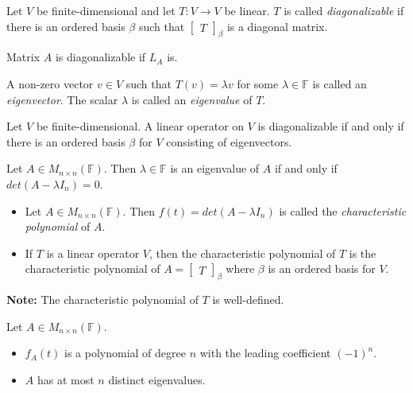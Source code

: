 \documentclass[12pt]{article}
\newenvironment{theorem}[2][Theorem]{\begin{trivlist}
\item[\hskip \labelsep {\bfseries #1}\hskip \labelsep {\bfseries #2.}]}{\end{trivlist}}
\newenvironment{definition}[2][Definition]{\begin{trivlist}
\item[\hskip \labelsep {\bfseries #1}\hskip \labelsep {\bfseries #2}]}{\end{trivlist}}
\begin{document}
\begin{definition}{1}
Let $V$ be finite-dimensional and let $T : V \to V$ be linear. $T$ is called \textit{diagonalizable} if there is an ordered basis $\beta$ such that $\begin{bmatrix} T \end{bmatrix}_\beta$ is a diagonal matrix.
\end{definition}

\noindent Matrix $A$ is diagonalizable if $L_A$ is.

\begin{definition}{2}
A non-zero vector $v \in V$ such that $T(v) = \lambda v$ for some $\lambda \in \mathbb{F}$ is called an \textit{eigenvector}. The scalar $\lambda$ is called an \textit{eigenvalue} of $T$.
\end{definition}

\begin{theorem}{5.1}
Let $V$ be finite-dimensional. A linear operator on $V$ is diagonalizable if and only if there is an ordered basis $\beta$ for $V$ consisting of eigenvectors.
\end{theorem}

\begin{theorem}{5.2}
Let $A \in M_{n \times n}(\mathbb{F})$. Then $\lambda \in \mathbb{F}$ is an eigenvalue of $A$ if and only if $det(A - \lambda I_n) = 0$.
\end{theorem}

\begin{definition}{3} \text{ }
\begin{itemize}
    \item Let $A \in M_{n \times n}(\mathbb{F})$. Then $f(t) = det(A - \lambda I_n)$ is called the \textit{characteristic polynomial} of $A$.
    
    \item If $T$ is a linear operator $V$, then the characteristic polynomial of $T$ is the characteristic polynomial of $A = \begin{bmatrix} T \end{bmatrix}_\beta$ where $\beta$ is an ordered basis for $V$.
\end{itemize}
\end{definition}

\noindent\textbf{Note:} The characteristic polynomial of $T$ is well-defined.

\begin{theorem}{5.3}
Let $A \in M_{n \times n}(\mathbb{F})$.

\begin{itemize}
    \item $f_A(t)$ is a polynomial of degree $n$ with the leading coefficient $(-1)^n$.
    
    \item $A$ has at most $n$ distinct eigenvalues.
\end{itemize}
\end{theorem}
\end{document}
